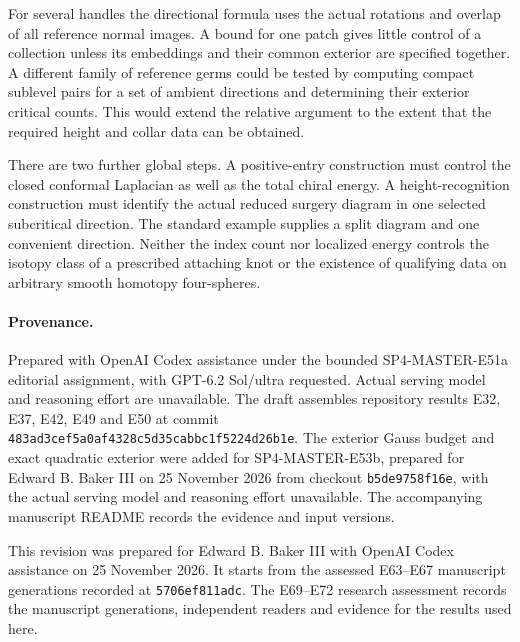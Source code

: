 \documentclass[11pt,letterpaper]{article}
\numberwithin{equation}{section}
\theoremstyle{definition}
\begin{document}
For several handles the directional formula uses the actual
rotations and overlap of all reference normal images. A bound
for one patch gives little control of a collection unless its
embeddings and their common exterior are specified together.
A different family of reference germs could be tested by
computing compact sublevel pairs for a set of ambient directions
and determining their exterior critical counts. This would
extend the relative argument to the extent that the required
height and collar data can be obtained.

There are two further global steps. A positive-entry construction
must control the closed conformal Laplacian as well as the total
chiral energy. A height-recognition construction must identify the
actual reduced surgery diagram in one selected subcritical
direction. The standard example supplies a split diagram and
one convenient direction. Neither the index count nor localized
energy controls the isotopy class of a prescribed attaching knot
or the existence of qualifying data on arbitrary smooth
homotopy four-spheres.

\paragraph{Provenance.}
Prepared with OpenAI Codex assistance under the bounded SP4-MASTER-E51a
editorial assignment, with GPT-6.2 Sol/ultra requested.
Actual serving model and reasoning effort are unavailable.
The draft assembles repository results E32, E37, E42, E49 and E50
at commit \texttt{483ad3cef5a0af4328c5d35cabbc1f5224d26b1e}.
The exterior Gauss budget and exact quadratic exterior were added
for SP4-MASTER-E53b, prepared for Edward B. Baker III on
25 November 2026 from checkout \texttt{b5de9758f16e}, with the
actual serving model and reasoning effort unavailable.
The accompanying manuscript README records the evidence and input versions.

This revision was prepared for Edward B. Baker III with OpenAI Codex
assistance on 25 November 2026. It starts from the assessed E63--E67 manuscript generations
recorded at \texttt{5706ef811adc}. The E69--E72 research assessment
records the manuscript generations, independent readers and evidence
for the results used here.



\end{document}

